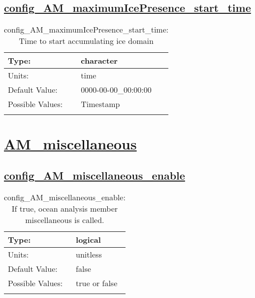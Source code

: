 \subsection[config\_AM\_maximumIcePresence\_start\_time]{\hyperref[sec:nm_tab_AM_maximumIcePresence]{config\_AM\_maximumIcePresence\_start\_time}}
\label{subsec:nm_sec_config_AM_maximumIcePresence_start_time}
\begin{center}
\begin{longtable}{| p{2.0in} || p{4.0in} |}
    \hline
    Type: & character \\
    \hline
    Units: & \si{time} \\
    \hline
    Default Value: & 0000-00-00\_00:00:00 \\
    \hline
    Possible Values: & Timestamp \\
    \hline
    \caption{config\_AM\_maximumIcePresence\_start\_time: Time to start accumulating ice domain}
\end{longtable}
\end{center}
\section[AM\_miscellaneous]{\hyperref[sec:nm_tab_AM_miscellaneous]{AM\_miscellaneous}}
\label{sec:nm_sec_AM_miscellaneous}
\subsection[config\_AM\_miscellaneous\_enable]{\hyperref[sec:nm_tab_AM_miscellaneous]{config\_AM\_miscellaneous\_enable}}
\label{subsec:nm_sec_config_AM_miscellaneous_enable}
\begin{center}
\begin{longtable}{| p{2.0in} || p{4.0in} |}
    \hline
    Type: & logical \\
    \hline
    Units: & \si{unitless} \\
    \hline
    Default Value: & false \\
    \hline
    Possible Values: & true or false \\
    \hline
    \caption{config\_AM\_miscellaneous\_enable: If true, ocean analysis member miscellaneous is called.}
\end{longtable}
\end{center}
